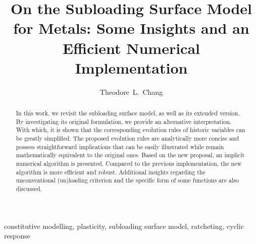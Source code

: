 \documentclass[3p,sort&compress,11pt,fleqn,review]{elsarticle}
\begin{document}
\linenumbers
\begin{abstract}
    \begin{linenumbers}
        In this work, we revisit the subloading surface model, as well as its extended version.
        By investigating its original formulation, we provide an alternative interpretation.
        With which, it is shown that the corresponding evolution rules of historic variables can be greatly simplified.
        The proposed evolution rules are analytically more concise and possess straightforward implications that can be easily illustrated while remain mathematically equivalent to the original ones.
        Based on the new proposal, an implicit numerical algorithm is presented.
        Compared to the previous implementation, the new algorithm is more efficient and robust.
        Additional insights regarding the unconventional (un)loading criterion and the specific form of some functions are also discussed.
    \end{linenumbers}
\end{abstract}
\begin{keyword}
    constitutive modelling\sep
    plasticity\sep
    subloading surface model\sep
    ratcheting\sep
    cyclic response
\end{keyword}
\begin{frontmatter}
    \title{On the Subloading Surface Model for Metals: Some Insights and an Efficient Numerical Implementation}
    \author[add1]{Theodore~L.~Chang}
    \address[add1]{IRIS Adlershof, Humboldt-Universität zu Berlin, Berlin, Germany, 12489.}
\end{frontmatter}





\end{document}
